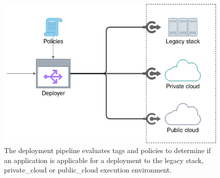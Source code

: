 \documentclass[../main.tex]{subfiles}
\begin{document}
    \begin{figure}[h]
        \centering
        \includegraphics[width=.9\linewidth]{img/concepts_deploy_policies_v2.png}
        \captionsetup{justification=centering}
        \caption{
            The deployment pipeline evaluates tags and policies to determine if an application is applicable for a deployment to the legacy stack, \gls{private_cloud} or \gls{public_cloud} execution environment.
        }
        \label{fig:pipeline_policies}
    \end{figure}
\end{document}
